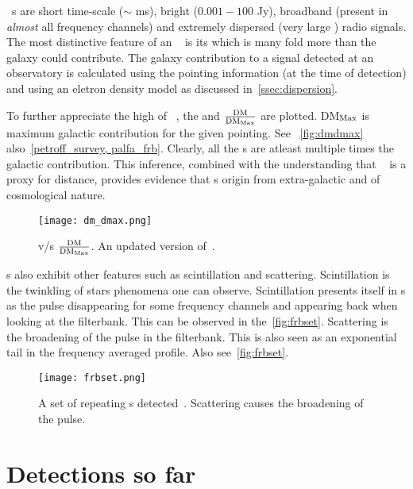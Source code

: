 \par \frb{}~s are short time-scale ($\sim$ ms), bright ($0.001 - 100$ Jy), broadband (present in \emph{almost} all frequency channels) and extremely dispersed (very large \dm) radio signals. 
The most distinctive feature of an \frb{}~ is its \dm which is many fold more than the galaxy could contribute. The galaxy contribution to a signal detected at an observatory is calculated using the pointing information (at the time of detection) and using an eletron density model as discussed in~\autoref{ssec:dispersion}.

\par To further appreciate the high \dm of \frb{}~, the \dm and $\frac{\rm DM}{{\rm DM}_{\rm Max}}$ are plotted. DM$_{\rm Max}$ is maximum galactic contribution for the given pointing. See ~\autoref{fig:dmdmax} also~\autoref{petroff_survey, palfa_frb}. Clearly, all the \frb{}s are atleast multiple times the galactic contribution. This inference, combined with the understanding that \dm~ is a proxy for distance, provides evidence that \frb{}s origin from extra-galactic and of cosmological nature.

\begin{figure}
\label{fig:dmdmax}
	\centering
	\texttt{[image: dm\_dmax.png]}
\caption{\dm v/s $\frac{\rm DM}{{\rm DM}_{\rm Max}}$. An updated version of~\cite{petroff_survey, palfa_frb}.}
\end{figure}

\par \frb{}s also exhibit other features such as scintillation and scattering. Scintillation is the twinkling of stars phenomena one can observe. 
Scintillation presents itself in \frb{}s as the pulse disappearing for some frequency channels and appearing back when looking at the filterbank. This can be observed in the~\autoref{fig:frbset}. 
Scattering is the broadening of the pulse in the filterbank. This is also seen as an exponential tail in the frequency averaged profile.
Also see~\autoref{fig:frbset}.

\begin{figure}
	\label{fig:frbset}
	\centering
	\texttt{[image: frbset.png]}
	\caption{A set of repeating \frb{}s detected~\cite{chime_repeater9}. Scattering causes the broadening of the pulse.}
\end{figure}

\section{Detections so far}
\label{sec:detect_so_far}

